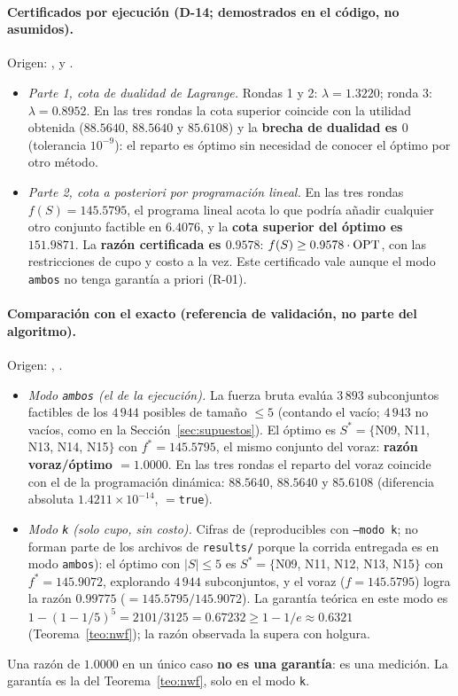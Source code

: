 \paragraph{Certificados por ejecución (D-14; demostrados en el código, no asumidos).} Origen: ,  y .
\begin{itemize}[leftmargin=*]
\item \emph{Parte 1, cota de dualidad de Lagrange.} Rondas 1 y 2: $\lambda=1.3220$; ronda 3: $\lambda=0.8952$. En las tres rondas la cota superior coincide con la utilidad obtenida ($88.5640$, $88.5640$ y $85.6108$) y la \textbf{brecha de dualidad es $0$} (tolerancia $10^{-9}$): el reparto es óptimo sin necesidad de conocer el óptimo por otro método.
\item \emph{Parte 2, cota a posteriori por programación lineal.} En las tres rondas $f(S)=145.5795$, el programa lineal acota lo que podría añadir cualquier otro conjunto factible en $6.4076$, y la \textbf{cota superior del óptimo es $151.9871$}. La \textbf{razón certificada es $0.9578$}: $f(S)\ge0.9578\cdot\mathrm{OPT}$, con las restricciones de cupo y costo a la vez. Este certificado vale aunque el modo \texttt{ambos} no tenga garantía a priori (R-01).
\end{itemize}

\paragraph{Comparación con el exacto (referencia de validación, no parte del algoritmo).} Origen: , .
\begin{itemize}[leftmargin=*]
\item \emph{Modo \texttt{ambos} (el de la ejecución).} La fuerza bruta evalúa $3\,893$ subconjuntos factibles de los $4\,944$ posibles de tamaño $\le5$ (contando el vacío; $4\,943$ no vacíos, como en la Sección~\ref{sec:supuestos}). El óptimo es $S^\ast=\{$N09, N11, N13, N14, N15$\}$ con $f^\ast=145.5795$, el mismo conjunto del voraz: \textbf{razón voraz/óptimo $=1.0000$}. En las tres rondas el reparto del voraz coincide con el de la programación dinámica: $88.5640$, $88.5640$ y $85.6108$ (diferencia absoluta $1.4211\times10^{-14}$, $=$\texttt{true}).
\item \emph{Modo \texttt{k} (solo cupo, sin costo).} Cifras de  (reproducibles con \texttt{--modo k}; no forman parte de los archivos de \texttt{results/} porque la corrida entregada es en modo \texttt{ambos}): el óptimo con $|S|\le5$ es $S^\ast=\{$N09, N11, N12, N13, N15$\}$ con $f^\ast=145.9072$, explorando $4\,944$ subconjuntos, y el voraz ($f=145.5795$) logra la razón $0.99775$ ($=145.5795/145.9072$). La garantía teórica en este modo es $1-(1-1/5)^5=2101/3125=0.67232\ge1-1/e\approx0.6321$ (Teorema~\ref{teo:nwf}); la razón observada la supera con holgura.
\end{itemize}
Una razón de $1.0000$ en un único caso \textbf{no es una garantía}: es una medición. La garantía es la del Teorema~\ref{teo:nwf}, solo en el modo \texttt{k}.

